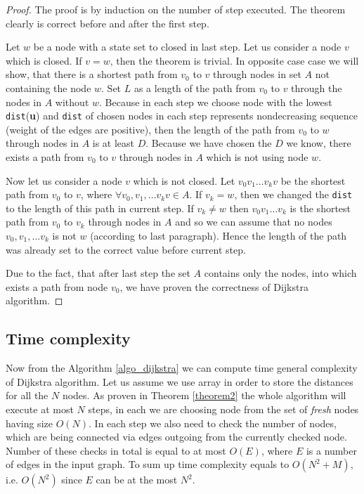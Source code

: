 \documentclass[thesis=M,english]{FITthesis}[2012/10/20]
\begin{document}
\begin{proof}
The proof is by induction on the number of step executed. The theorem clearly is correct before and after the first step. 

Let $w$ be a node with a state set to closed in last step. Let us consider a node $v$ which is closed.
If $v=w$, then the theorem is trivial. In opposite case case we will show, that there is a shortest path from $v_0$ to $v$ through nodes in set $A$ not containing the node $w$. Set $L$ as a length of the path from $v_0$ to $v$ through the nodes in $A$ without $w$. Because in each step we choose node with the lowest \texttt{dist}(\textbf{u}) and \texttt{dist} of chosen nodes in each step represents nondecreasing sequence (weight of the edges are positive), then the length of the path from $v_0$ to $w$ through nodes in $A$ is at least $D$. Because we have chosen the $D$ we know, there exists a path from $v_0$ to $v$ through nodes in $A$ which is not using node $w$.

Now let us consider a node $v$ which is not closed. Let $v_0 v_1 \dots v_k v$ be the shortest path from $v_0$ to $v$, where $\forall v_0, v_1, \dots v_k v \in A$. 
If $v_k = w$, then we changed the \texttt{dist} to the length of this path in current step. If $v_k \neq w$ then $v_0 v_1 \dots v_k$ is the shortest path from $v_0$ to $v_k$ through nodes in $A$ and so we can assume that no nodes $v_0, v_1, \dots v_k $ is not $w$ (according to last paragraph). Hence the length of the path was already set to the correct value before current step.

Due to the fact, that after last step the set $A$ contains only the nodes, into which exists a path from node $v_0$, we have proven the correctness of Dijkstra algorithm.
\end{proof}

\subsection{Time complexity}
Now from the Algorithm \ref{algo_dijkstra} we can compute time general complexity of Dijkstra algorithm. Let us assume we use array in order to store the distances for all the $N$ nodes. As proven in Theorem \ref{theorem2} the whole algorithm will execute at most $N$ steps, in each we are choosing node from the set of \textit{fresh} nodes having size $O(N)$. In each step we also need to check the number of nodes, which are being connected via edges outgoing from the currently checked node. Number of these checks in total is equal to at most $O(E)$, where $E$ is a number of edges in the input graph. To sum up time complexity equals to $O(N^2 + M)$, i.e. $O(N^2)$ since $E$ can be at the most $N^2$.
\end{document}
